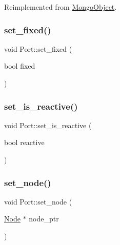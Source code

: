Reimplemented from \hyperlink{class_mongo_object_a729412e226c9964e13ba80688c3f5e00}{Mongo\+Object}.

\mbox{\label{class_port_af913356cf60ebe37fb03d213db73b1bc}} 
\subsubsection{\texorpdfstring{set\+\_\+fixed()}{set\_fixed()}}
{\footnotesize\ttfamily void Port\+::set\+\_\+fixed (\begin{DoxyParamCaption}\item[{bool}]{fixed }\end{DoxyParamCaption})}

\mbox{\label{class_port_ae2808ef3b67c3dd01222aee10e35f6cd}} 
\subsubsection{\texorpdfstring{set\+\_\+is\+\_\+reactive()}{set\_is\_reactive()}}
{\footnotesize\ttfamily void Port\+::set\+\_\+is\+\_\+reactive (\begin{DoxyParamCaption}\item[{bool}]{reactive }\end{DoxyParamCaption})\hspace{0.3cm}{\ttfamily [inline]}}

\mbox{\label{class_port_a5dfef60c4b30386e97d2829a23a0d3d3}} 
\subsubsection{\texorpdfstring{set\+\_\+node()}{set\_node()}}
{\footnotesize\ttfamily void Port\+::set\+\_\+node (\begin{DoxyParamCaption}\item[{\hyperlink{class_node}{Node} $\ast$}]{node\+\_\+ptr }\end{DoxyParamCaption})\hspace{0.3cm}{\ttfamily [inline]}}

\mbox{\label{class_port_ab35e1343f0db5a0b258d9541958324bc}} 

